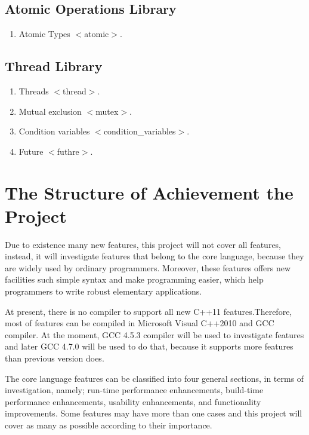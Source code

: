 \documentclass[11pt,]{report}
\begin{document}
\subsection{Atomic Operations Library}
\label{sub-section:	Atomic operations library}
\begin{enumerate}
\item Atomic Types $<$atomic$>$.
\end{enumerate}

\subsection{Thread Library }
\label{sub-section: Thread library }
\begin{enumerate}
\item Threads $<$thread$>$.
\item Mutual exclusion $<$mutex$>$.
\item Condition variables $<$condition\_variables$>$.
\item Future $<$futhre$>$.
\end{enumerate}


\section{The Structure of Achievement the Project}
\label{section:The structure of achievement  the project}
Due to existence many new features, this project will not cover all features, instead, it will investigate features that belong to the core language, because they are widely used by ordinary programmers.  Moreover, these features offers new facilities such simple syntax and make programming easier, which help programmers to write robust elementary applications.

At present, there is no compiler to support all new C++11 features.\linebreak Therefore, most of features can be compiled in Microsoft Visual C++2010 and GCC compiler. At the moment,  GCC 4.5.3  compiler will be used to investigate features and later GCC 4.7.0 will be used to do that, because it supports more features than previous version does.

The core language features can be classified into four general sections, in terms of investigation, namely; run-time performance enhancements, build-time performance enhancements, usability enhancements, and functionality \linebreak improvements. Some features may have more than one cases and this project will cover as many as possible according to their importance.
\end{document}
